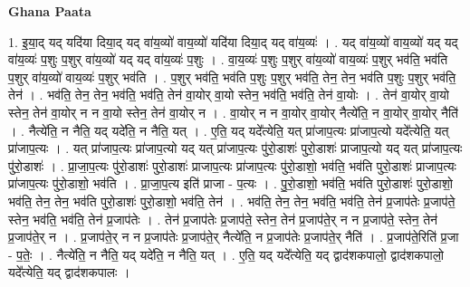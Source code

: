\documentclass[17pt]{extarticle}
\begin{document}
\textbf{Ghana Paata } \newline

1. इ॒या॒द् यद् यदि॑या दिया॒द् यद् वा॑य॒व्यो॑ वाय॒व्यो॑ यदि॑या दिया॒द् यद् वा॑य॒व्यः॑ । . यद् वा॑य॒व्यो॑ वाय॒व्यो॑ यद् यद् वा॑य॒व्यः॑ प॒शुः प॒शुर् वा॑य॒व्यो॑ यद् यद् वा॑य॒व्यः॑ प॒शुः । . वा॒य॒व्यः॑ प॒शुः प॒शुर् वा॑य॒व्यो॑ वाय॒व्यः॑ प॒शुर् भव॑ति॒ भव॑ति प॒शुर् वा॑य॒व्यो॑ वाय॒व्यः॑ प॒शुर् भव॑ति । . प॒शुर् भव॑ति॒ भव॑ति प॒शुः प॒शुर् भव॑ति॒ तेन॒ तेन॒ भव॑ति प॒शुः प॒शुर् भव॑ति॒ तेन॑ । . भव॑ति॒ तेन॒ तेन॒ भव॑ति॒ भव॑ति॒ तेन॑ वा॒योर् वा॒यो स्तेन॒ भव॑ति॒ भव॑ति॒ तेन॑ वा॒योः । . तेन॑ वा॒योर् वा॒यो स्तेन॒ तेन॑ वा॒योर् न न वा॒यो स्तेन॒ तेन॑ वा॒योर् न । . वा॒योर् न न वा॒योर् वा॒योर् नैत्ये॑ति॒ न वा॒योर् वा॒योर् नैति॑ । . नैत्ये॑ति॒ न नैति॒ यद् यदे॑ति॒ न नैति॒ यत् । . ए॒ति॒ यद् यदे᳚त्येति॒ यत् प्रा॑जाप॒त्यः प्रा॑जाप॒त्यो यदे᳚त्येति॒ यत् प्रा॑जाप॒त्यः । . यत् प्रा॑जाप॒त्यः प्रा॑जाप॒त्यो यद् यत् प्रा॑जाप॒त्यः पु॑रो॒डाशः॑ पुरो॒डाशः॑ प्राजाप॒त्यो यद् यत् प्रा॑जाप॒त्यः पु॑रो॒डाशः॑ । . प्रा॒जा॒प॒त्यः पु॑रो॒डाशः॑ पुरो॒डाशः॑ प्राजाप॒त्यः प्रा॑जाप॒त्यः पु॑रो॒डाशो॒ भव॑ति॒ भव॑ति पुरो॒डाशः॑ प्राजाप॒त्यः प्रा॑जाप॒त्यः पु॑रो॒डाशो॒ भव॑ति । . प्रा॒जा॒प॒त्य इति॑ प्राजा - प॒त्यः । . पु॒रो॒डाशो॒ भव॑ति॒ भव॑ति पुरो॒डाशः॑ पुरो॒डाशो॒ भव॑ति॒ तेन॒ तेन॒ भव॑ति पुरो॒डाशः॑ पुरो॒डाशो॒ भव॑ति॒ तेन॑ । . भव॑ति॒ तेन॒ तेन॒ भव॑ति॒ भव॑ति॒ तेन॑ प्र॒जाप॑तेः प्र॒जाप॑ते॒ स्तेन॒ भव॑ति॒ भव॑ति॒ तेन॑ प्र॒जाप॑तेः । . तेन॑ प्र॒जाप॑तेः प्र॒जाप॑ते॒ स्तेन॒ तेन॑ प्र॒जाप॑ते॒र् न न प्र॒जाप॑ते॒ स्तेन॒ तेन॑ प्र॒जाप॑ते॒र् न । . प्र॒जाप॑ते॒र् न न प्र॒जाप॑तेः प्र॒जाप॑ते॒र् नैत्ये॑ति॒ न प्र॒जाप॑तेः प्र॒जाप॑ते॒र् नैति॑ । . प्र॒जाप॑ते॒रिति॑ प्र॒जा - प॒तेः॒ । . नैत्ये॑ति॒ न नैति॒ यद् यदे॑ति॒ न नैति॒ यत् । . ए॒ति॒ यद् यदे᳚त्येति॒ यद् द्वाद॑शकपालो॒ द्वाद॑शकपालो॒ यदे᳚त्येति॒ यद् द्वाद॑शकपालः । \newline
\end{document}
